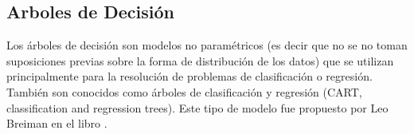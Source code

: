 \documentclass[letterpaper,12pt, twoside]{report}
\providecommand{\DIFdeltex}[1]{{\protect\color{red} \scriptsize #1}} %
\providecommand{\DIFdel}[1]{\texorpdfstring{\DIFdeltex{#1}}{}} %
\begin{document}

\subsection{\DIFdel{Arboles de Decisión}}
\addtocounter{subsection}{-1}%
\DIFdel{Los árboles de decisión son modelos no paramétricos (es decir que no se no toman suposiciones previas sobre la forma de distribución de los datos) que se utilizan principalmente para la resolución de problemas de clasificación o regresión. También son conocidos como árboles de clasificación y regresión (CART, classification and regression trees). Este tipo de modelo fue propuesto por Leo Breiman en el libro \cite{breiman1984}.
}%
\end{document}
